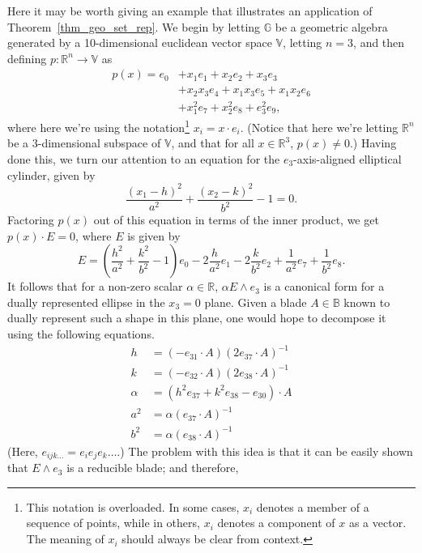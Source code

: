 \documentclass{birkjour}
\theoremstyle{definition}
\theoremstyle{remark}
\numberwithin{equation}{section}
\newcommand{\R}{\mathbb{R}}
\newcommand{\B}{\mathbb{B}}
\newcommand{\G}{\mathbb{G}}
\newcommand{\V}{\mathbb{V}}
\begin{document}
Here it may be worth giving an example that illustrates an application of Theorem~\ref{thm_geo_set_rep}.
We begin by letting $\G$ be a geometric algebra generated by a 10-dimensional euclidean vector space $\V$, letting $n=3$, and then defining
$p:\R^n\to\V$ as
\begin{align}
p(x) = e_0
 &+ x_1e_1 + x_2e_2 + x_3e_3 \nonumber\\
 &+ x_2x_3e_4 + x_1x_3e_5 + x_1x_2e_6 \nonumber\\
 &+ x_1^2e_7 + x_2^2e_8 + e_3^2e_9,\label{equ_p_quadric}
\end{align}
where here we're using the notation\footnote{This notation is overloaded.  In some cases, $x_i$ denotes a member
of a sequence of points, while in others, $x_i$ denotes a component of $x$ as a vector.  The meaning of $x_i$ should
always be clear from context.} $x_i=x\cdot e_i$.  (Notice that here we're letting $\R^n$ be
a 3-dimensional subspace of $\V$, and that for all $x\in\R^3$, $p(x)\neq 0$.)  Having done this,
we turn our attention to an equation for the $e_3$-axis-aligned elliptical cylinder, given by
\begin{equation}
\frac{(x_1-h)^2}{a^2}+\frac{(x_2-k)^2}{b^2}-1=0.
\end{equation}
Factoring $p(x)$ out of this equation in terms of the inner product, we get $p(x)\cdot E=0$,
where $E$ is given by
\begin{equation}
E = \left(\frac{h^2}{a^2}+\frac{k^2}{b^2}-1\right)e_0-2\frac{h}{a^2}e_1-2\frac{k}{b^2}e_2+\frac{1}{a^2}e_7+\frac{1}{b^2}e_8.
\end{equation}
It follows that for a non-zero scalar $\alpha\in\R$, $\alpha E\wedge e_3$ is a canonical form for a dually represented ellipse in the $x_3=0$ plane.
Given a blade $A\in\B$ known to dually represent such a shape in this plane, one would hope to decompose it using the following equations.
\begin{align}
h &= (-e_{31}\cdot A)(2e_{37}\cdot A)^{-1}\label{equ_decompose_first} \\
k &= (-e_{32}\cdot A)(2e_{38}\cdot A)^{-1} \\
\alpha &= (h^2e_{37}+k^2e_{38}-e_{30})\cdot A \\
a^2 &= \alpha(e_{37}\cdot A)^{-1} \\
b^2 &= \alpha(e_{38}\cdot A)^{-1}\label{equ_decompose_last}
\end{align}
(Here, $e_{ijk\dots}=e_ie_je_k\dots$.)
The problem with this idea is that it can be easily shown that $E\wedge e_3$ is a reducible blade; and therefore,
\end{document}
